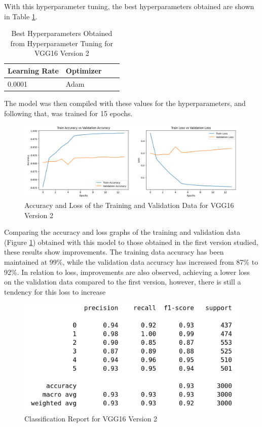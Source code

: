 \documentclass[conference]{IEEEtran}
\begin{document}
With this hyperparameter tuning, the best hyperparameters obtained are shown in Table \ref{tab:resultsHyperparametersVGG16}.

\begin{table}[H]
    \centering
    \caption{Best Hyperparameters Obtained from Hyperparameter Tuning for VGG16 Version 2}
    \renewcommand{\arraystretch}{1.5}
    \begin{tabularx}{0.8\linewidth}{|X|X|X|X|}
    \hline
    \cellcolor[HTML]{EFEFEF}\textbf{Learning Rate} & \cellcolor[HTML]{EFEFEF}\textbf{Optimizer}\\ \hline
     0.0001  & Adam \\ \hline
    \end{tabularx}
    \label{tab:resultsHyperparametersVGG16}
\end{table}

The model was then compiled with these values for the hyperparameters, and following that, was trained for 15 epochs.

\begin{figure}[H]
    \centering
    \includegraphics[width=1\linewidth]{images/acc&lossVGG16_2.png}
    \caption{Accuracy and Loss of the Training and Validation Data for VGG16 Version 2}
    \label{fig:acc&lossVGG16_2}
\end{figure}

Comparing the accuracy and loss graphs of the training and validation data (Figure \ref{fig:acc&lossVGG16_2}) obtained with this model to those obtained in the first version studied, these results show improvements. The training data accuracy has been maintained at 99\%, while the validation data accuracy has increased from 87\% to 92\%. In relation to loss, improvements are also observed, achieving a lower loss on the validation data compared to the first version, however, there is still a tendency for this loss to increase

\begin{figure}[H]
    \centering
    \includegraphics[width=0.7\linewidth]{images/classReportVGG16_2.png}
    \caption{Classification Report for VGG16 Version 2}
    \label{fig:classReportVGG16_2}
\end{figure}
\end{document}
